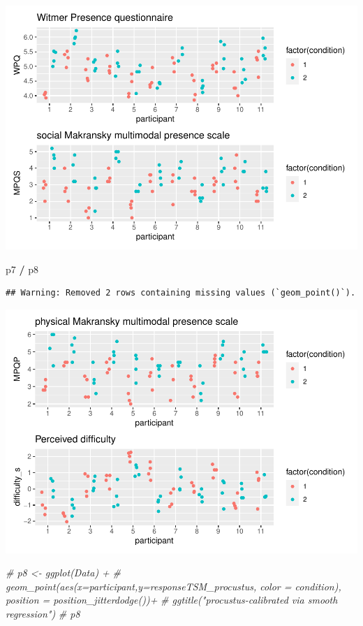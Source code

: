 \documentclass[
]{article}
\newenvironment{Shaded}{\begin{snugshade}}{\end{snugshade}}
\newcommand{\CommentTok}[1]{\textcolor[rgb]{0.56,0.35,0.01}{\textit{#1}}}
\newcommand{\NormalTok}[1]{#1}
\newcommand{\SpecialCharTok}[1]{\textcolor[rgb]{0.81,0.36,0.00}{\textbf{#1}}}
\begin{document}
\includegraphics{06_Publish_GUSO_ASIL_files/figure-latex/showmetrics2-1.pdf}

\begin{Shaded}
\begin{Highlighting}[]
\NormalTok{p7 }\SpecialCharTok{/}\NormalTok{ p8}
\end{Highlighting}
\end{Shaded}

\begin{verbatim}
## Warning: Removed 2 rows containing missing values (`geom_point()`).
\end{verbatim}

\includegraphics{06_Publish_GUSO_ASIL_files/figure-latex/showmetrics2-2.pdf}

\begin{Shaded}
\begin{Highlighting}[]
\CommentTok{\# p8 \textless{}{-} ggplot(Data) +}
\CommentTok{\#   geom\_point(aes(x=participant,y=responseTSM\_procustus, color = condition), position = position\_jitterdodge())+}
\CommentTok{\#   ggtitle("procustus{-}calibrated via smooth regression")}
\CommentTok{\# p8}
\end{Highlighting}
\end{Shaded}
\end{document}
